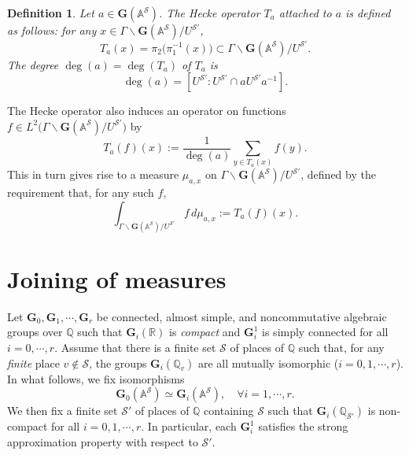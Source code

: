 \documentclass[11pt,oneside,reqno]{amsart}
\newcommand{\bfG}{\mathbf{G}}
\newcommand{\A}{\mathbb{A}}
\newcommand{\Q}{\mathbb{Q}}
\newcommand{\R}{\mathbb{R}}
\newcommand{\Scal}{\mathcal{S}}
\newcommand{\Gbf}{\mathbf{G}}
\newcommand{\bcS}{\mathcal{S}}
\theoremstyle{plain}
\newtheorem{definition}[theorem]{Definition}
\begin{document}
	\begin{definition}
		Let $a\in\bfG(\mathbb{A}^{\bcS})$. The \emph{Hecke operator $T_a$} attached to $a$ is defined as follows: for any $x\in\Gamma\backslash\bfG(\mathbb{A}^{\bcS})/U^{\bcS'}$,
		\[
		T_a(x)
		=
		\pi_2\bigl(\pi_1^{-1}(x)\bigr)
		\subset
		\Gamma\backslash\bfG(\mathbb{A}^{\bcS})/U^{\bcS'}.
		\]
		The degree $\deg(a)=\deg(T_a)$ of $T_a$ is
		\[
		\deg(a)
		=
		[U^{\bcS'}\colon U^{\bcS'}\cap aU^{\bcS'} a^{-1}].
		\]
	\end{definition}
	
	
	
	
	
	
	
	
	
	
	
	The Hecke operator also induces an operator on functions $f\in L^2\bigl(\Gamma\backslash\bfG(\mathbb{A}^{\bcS})/U^{\bcS'}\bigr)$ by
	\[
	T_a(f)(x)
	:=
	\frac{1}{\deg(a)}
	\sum_{y\in T_a(x)}
	f(y).
	\]
	This in turn gives rise to a measure $\mu_{a,x}$ on $\Gamma\backslash\bfG(\mathbb{A}^{\bcS})/U^{\bcS'}$, defined by the requirement that, for any such $f$,
	\[
	\int_{\Gamma\backslash\bfG(\mathbb{A}^{\bcS})/U^{\bcS'}}
	f\, d\mu_{a,x}
	:=	
	T_a(f)(x).
	\]
	
	
	
	
	
	
	
	
	\section{Joining of measures}\label{joining of measures}
	Let $\bfG_0,\bfG_1,\cdots,\bfG_r$ be connected, almost simple, and noncommutative algebraic groups over $\Q$ such that $\bfG_i(\R)$ is \emph{compact} and $\Gbf_i^1$ is simply connected for all $i=0,\cdots,r$. Assume that there is a finite set $\bcS$ of places of $\Q$ such that, for any \emph{finite} place $v\notin\bcS$, the groups $\bfG_i(\Q_v)$ are all mutually isomorphic ($i=0,1,\cdots,r$). In what follows, we fix isomorphisms
	\begin{equation}\label{G_i(A_f^S)=G_0(A_f^S)}
		\Gbf_0(\A^\Scal)\simeq\Gbf_i(\A^\Scal),
		\quad
		\forall
		i=1,\cdots,r.
	\end{equation}
	We then fix a finite set $\bcS'$ of places of $\Q$ containing $\bcS$ such that $\bfG_i(\Q_{\bcS'})$ is non-compact for all $i=0,1,\cdots,r$. In particular, each $\bfG_i^1$ satisfies the strong approximation property with respect to $\bcS'$.
	
	
	
\end{document}
